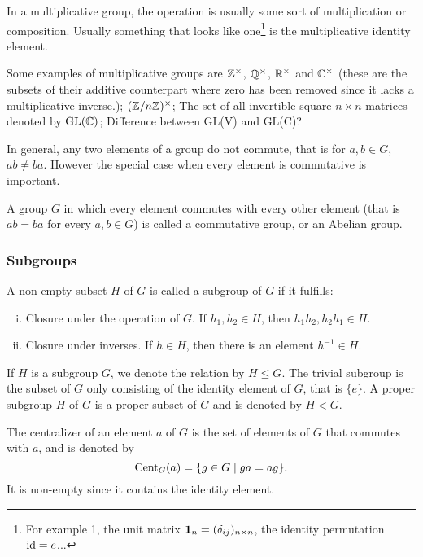 In a multiplicative group, the operation is usually some sort of multiplication or composition. Usually something that looks like one\footnote{For example 1, the unit matrix $\mathbf{1}_n = (\delta_{ij})_{n \times n}$, the identity permutation $\text{id} = e$...} is the multiplicative identity element.

\begin{example}	
	Some examples of multiplicative groups are $\mathbb{Z}^\times$, $\mathbb{Q}^\times$, $\mathbb{R}^\times$ and $\mathbb{C}^\times$ (these are the subsets of their additive counterpart where zero has been removed since it lacks a multiplicative inverse.); $(\mathbb{Z} / n \mathbb{Z})^\times$; The set of all invertible square $n \times n$ matrices denoted by $\text{GL}(\mathbb{C})$; Difference between GL(V) and GL(C)?
\end{example}

In general, any two elements of a group do not commute, that is for $a,b \in G$, $ab \neq ba$. However the special case when every element is commutative is important.

\begin{definition}
	A group $G$ in which every element commutes with every other element (that is $ab = ba$ for every $a,b \in G$) is called a commutative group, or an Abelian group.
\end{definition}

\subsubsection{Subgroups}

\begin{definition}[Subgroup]
	A non-empty subset $H$ of $G$ is called a subgroup of $G$ if it fulfills:
	\begin{enumerate}[i)]
		\item Closure under the operation of $G$. If $h_1, h_2 \in H$, then $h_1 h_2, h_2 h_1 \in H$.
		\item Closure under inverses. If $h \in H$, then there is an element $h^{-1} \in H$.
	\end{enumerate}
	If $H$ is a subgroup $G$, we denote the relation by $H \leq G$. The trivial subgroup is the subset of $G$ only consisting of the identity element of $G$, that is $\{e\}$. A proper subgroup $H$ of $G$ is a proper subset of $G$ and is denoted by $H < G$.
\end{definition}

\begin{definition}[Centralizer]
	The centralizer of an element $a$ of $G$ is the set of elements of $G$ that commutes with $a$, and is denoted by 
	\[
	\text{Cent}_G(a) = \{ g \in G \mid ga = ag \}.
	\]
	It is non-empty since it contains the identity element.
\end{definition}

